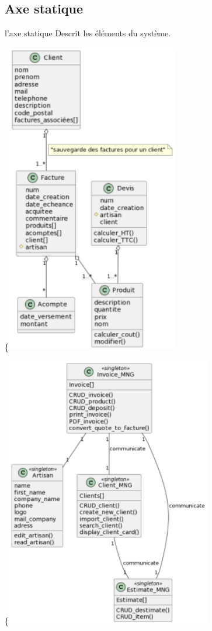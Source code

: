 \documentclass[a4paper,10pt]{scrartcl}
\begin{document}
\subsection{Axe statique}
l'axe statique Descrit les éléments du système.

\{\includegraphics[width=7.5cm]{c1.png}

\{\includegraphics[width=9cm]{c2.png}
\end{document}
